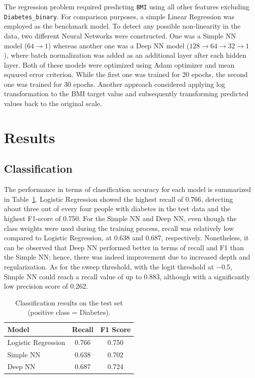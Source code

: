 \documentclass{article}
\begin{document}
The regression problem required predicting \texttt{BMI} using all other features excluding \texttt{Diabetes\_binary}. For comparison purposes, a simple Linear Regression was employed as the benchmark model. To detect any possible non-linearity in the data, two different Neural Networks were constructed. One was a Simple NN model ($\textit{64}\rightarrow1$) whereas another one was a Deep NN model ($\textit{128}\rightarrow64\rightarrow32\rightarrow1$), where batch normalization was added as an additional layer after each hidden layer. Both of these models were optimized using Adam optimizer and mean squared error criterion. While the first one was trained for 20 epochs, the second one was trained for 30 epochs. Another approach considered applying log transformation to the BMI target value and subsequently transforming predicted values back to the original scale.

\section{Results}

\subsection{Classification}

The performance in terms of classification accuracy for each model is summarized in Table~\ref{tab:clf}. Logistic Regression showed the highest recall of 0.766, detecting about three out of every four people with diabetes in the test data and the highest F1-score of 0.750. For the Simple NN and Deep NN, even though the class weights were used during the training process, recall was relatively low compared to Logistic Regression, at 0.638 and 0.687, respectively. Nonetheless, it can be observed that Deep NN performed better in terms of recall and F1 than the Simple NN; hence, there was indeed improvement due to increased depth and regularization. As for the sweep threshold, with the logit threshold at $-$0.5, Simple NN could reach a recall value of up to 0.883, although with a significantly low precision score of 0.262.

\begin{table}[h]
  \caption{Classification results on the test set (positive class = Diabetes).}
  \label{tab:clf}
  \centering
  \begin{tabular}{lcc}
    \toprule
    Model & Recall & F1 Score \\
    \midrule
    Logistic Regression & 0.766 & 0.750 \\
    Simple NN           & 0.638 & 0.702 \\
    Deep NN             & 0.687 & 0.724 \\
    \bottomrule
  \end{tabular}
\end{table}
\end{document}
